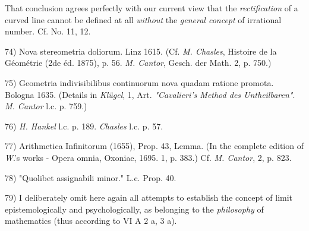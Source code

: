 \vfill
\leftline{\rule{2in}{0.4pt}}
\vspace{0.2cm}
{
\footnotesize
That conclusion agrees perfectly with our current view that the \textit{rectification} of a curved line cannot be defined at all \textit{without} the \textit{general concept} of irrational number. Cf. No. 11, 12.

74) Nova stereometria doliorum. Linz 1615. (Cf. \textit{M. Chasles}, Histoire de la Géométrie (2de éd. 1875), p. 56. \textit{M. Cantor}, Gesch. der Math. 2, p. 750.)

75) Geometria indivisibilibus continuorum nova quadam ratione promota. Bologna 1635. (Details in \textit{Klügel}, 1, Art. \textit{"Cavalieri's Method des Untheilbaren"}. \textit{M. Cantor} l.c. p. 759.)

76) \textit{H. Hankel} l.c. p. 189. \textit{Chasles} l.c. p. 57.

77) Arithmetica Infinitorum (1655), Prop. 43, Lemma. (In the complete edition of \textit{W}.'s works - Opera omnia, Oxoniae, 1695. 1, p. 383.) Cf. \textit{M. Cantor}, 2, p. 823.

78) "Quolibet assignabili minor." L.c. Prop. 40.

79) I deliberately omit here again all attempts to establish the concept of limit epistemologically and psychologically, as belonging to the \textit{philosophy} of mathematics (thus according to VI A 2 a, 3 a).

}
